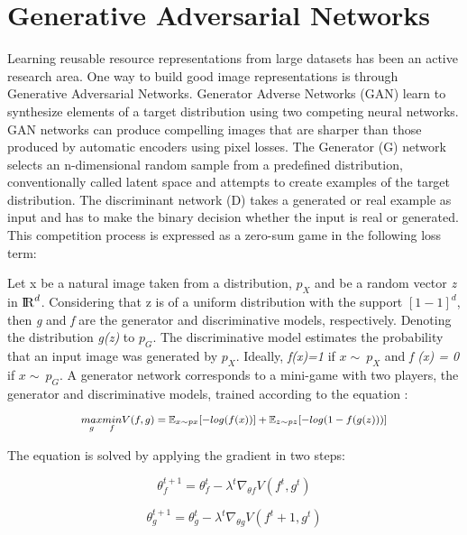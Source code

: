 \section{Generative Adversarial Networks}

Learning reusable resource representations from large datasets has been an active research area. One way to build good image representations is through Generative Adversarial Networks. Generator Adverse Networks (GAN) learn to synthesize elements of a target distribution using two competing neural networks. GAN networks can produce compelling images that are sharper than those produced by automatic encoders using pixel losses. The Generator (G) network selects an n-dimensional random sample from a predefined distribution, conventionally called latent space and attempts to create examples of the target distribution. The discriminant network (D) takes a generated or real example as input and has to make the binary decision whether the input is real or generated. This competition process is expressed as a zero-sum game in the following loss term:

Let x be a natural image taken from a distribution, $ p_X$ and be a random vector \textit{z} in $ {\rm I\!R}^d $. Considering that z is of a uniform distribution with the support $[1-1]^d$, then \textit{g} and \textit{f} are the generator and discriminative models, respectively. Denoting the distribution \textit{g(z)} to $ p_G $. The discriminative model estimates the probability that an input image was generated by $ p_X $. Ideally, \textit{f(x)=1}  if $x  \sim\  p_X$ and \textit{f (x) = 0} if $ x \sim\ p_G $. A generator network corresponds to a mini-game with two players, the generator and discriminative models, trained according to the equation \cite{Liu2016}:


\begin{equation}
\medmath{ \underset{g}{max} \underset{f}{min} V(f,g)= \mathbb{E}_{x \sim px} [-log(f(x))]+\mathbb{E}_{z \sim pz}[-log(1-f(g(z)))]} 
\end{equation}


The equation is solved by applying the gradient in two steps:

\begin{equation}
\theta^{t+1}_{f} = \theta^{t}_{f} -\lambda^t \nabla_{\theta f} V (f^t, g^t)
\end{equation}

\begin{equation}
\theta^{t+1}_{g} = \theta^{t}_{g} -\lambda^t \nabla_{\theta g} V (f^t+1, g^t)
\end{equation}


